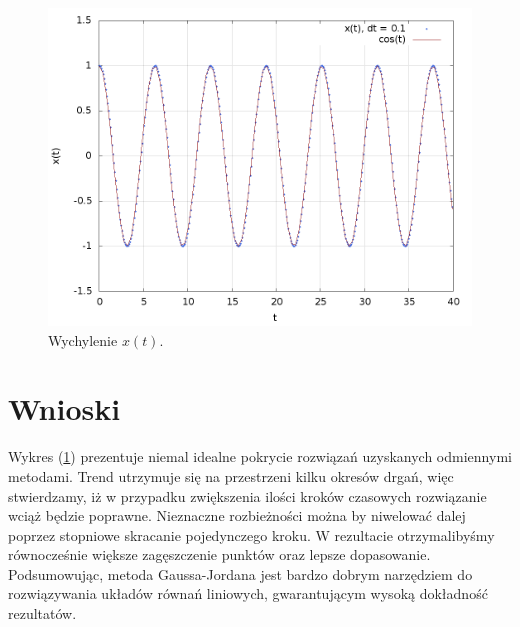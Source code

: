 \begin{figure}[h]
	\begin{center}
		\includegraphics[width=1.0\textwidth]{wychylenie.png}
		\caption{Wychylenie $x(t)$.}
		\label{wykres}
	\end{center}
\end{figure}

\newpage
\section{Wnioski}
Wykres (\ref{wykres}) prezentuje niemal idealne pokrycie rozwiązań uzyskanych odmiennymi metodami. Trend utrzymuje się na przestrzeni kilku okresów drgań, więc stwierdzamy, iż w przypadku zwiększenia ilości kroków czasowych rozwiązanie wciąż będzie poprawne. Nieznaczne rozbieżności można by niwelować dalej poprzez stopniowe skracanie pojedynczego kroku. W rezultacie otrzymalibyśmy równocześnie większe zagęszczenie punktów oraz lepsze dopasowanie. Podsumowując, metoda Gaussa-Jordana jest bardzo dobrym narzędziem do rozwiązywania układów równań liniowych, gwarantującym wysoką dokładność rezultatów.



